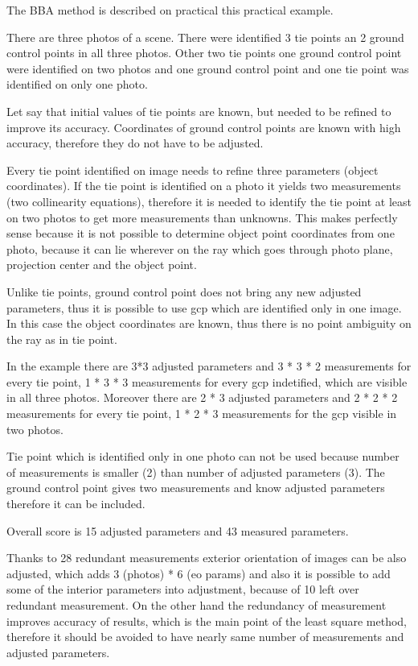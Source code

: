 \documentclass[a4paper,12pt]{report}
\begin{document}
The BBA method is described on practical this practical example.


There are three photos of a scene.
There were identified 3 tie points an 2 ground control points in all three photos.
Other two tie points one ground control point were identified on two photos and one ground control point and one tie point was identified 
on only one photo. 

Let say that initial values of tie points are known, but needed to be refined to improve its accuracy.
Coordinates of ground control points are known with high accuracy, therefore they do not have to be adjusted. 

Every tie point identified on image needs to refine three parameters (object coordinates). 
If the tie point is identified on a photo it yields two measurements (two collinearity equations), 
therefore it is needed to identify the tie point at least on two photos to get more measurements 
than unknowns. This makes perfectly sense because it is not possible to determine object point coordinates from one photo,
because it can lie wherever on the ray  which goes through photo plane, projection center and the object point.


Unlike tie points, ground control point does not bring any new adjusted parameters, thus
it is possible to use gcp which are identified only in one image. In this case the object coordinates 
are known, thus there is no point ambiguity on the ray as in tie point. 

In the example there are 3*3 adjusted parameters and 3 * 3 * 2 measurements for every tie point,  
1 * 3 * 3 measurements for every gcp indetified, which are visible in all three photos. 
Moreover there are 2 * 3 adjusted parameters and 2 * 2 * 2 measurements for every tie point,  
1 * 2 * 3 measurements for the gcp visible in two photos.

Tie point which is identified only in one photo can not be used because number of measurements is smaller (2) than number of adjusted parameters (3).
The ground control point gives two measurements and know adjusted parameters therefore it can be included.

Overall score is 15 adjusted parameters and 43 measured parameters.

Thanks to 28 redundant measurements exterior orientation of images can be also adjusted, which adds 3 (photos) * 6 (eo params)
and also it is possible to add some of the interior parameters into adjustment, because of 10 left over redundant measurement.  
On the other hand the redundancy of measurement improves accuracy of results, which is the main point of the least square method,
therefore it should be avoided to have nearly same number of measurements and adjusted parameters.
\end{document}
